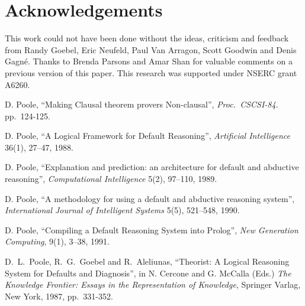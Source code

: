 \section*{Acknowledgements}
This work could not have been done without the ideas,
criticism and feedback from Randy Goebel, Eric Neufeld,
Paul Van Arragon, Scott Goodwin and Denis Gagn\'e.
Thanks to Brenda Parsons and Amar Shan for valuable comments on
a previous version of this paper.
This research was supported under NSERC grant A6260.
\begin{thebibliography}{McDer80}

D. Poole,
``Making Clausal theorem provers Non-clausal'',
{\em Proc.\ CSCSI-84}. pp.~124-125.

D. Poole,
``A Logical Framework for Default Reasoning'',
{\em Artificial Intelligence} 36(1), 27--47, 1988.

D. Poole,
``Explanation and prediction: an architecture for default
and abductive reasoning'', {\em Computational Intelligence} 5(2),
97--110, 1989.

D. Poole, ``A methodology for using a default and abductive reasoning
system'', {\em International Journal of Intelligent Systems} 5(5),
521--548, 1990.

D. Poole,
``Compiling a Default Reasoning System into {Prolog}'',
{\em New Generation Computing}, 9(1), 3--38, 1991.

D.\ L.\ Poole, R.\ G.\ Goebel and R.\ Aleliunas,
``Theorist: A Logical Reasoning System for Defaults and Diagnosis'',
in N. Cercone and G. McCalla (Eds.)
{\it The Knowledge Frontier: Essays in the Representation of
Knowledge},
Springer Varlag, New York, 1987, pp.\ 331-352.

\end{thebibliography}



